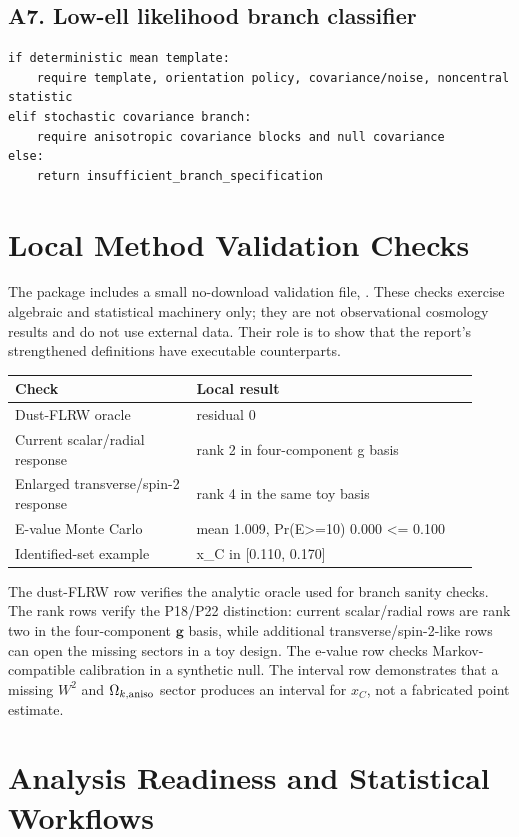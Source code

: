 \documentclass[11pt]{article}
\newcommand{\code}[1]{\texttt{\detokenize{#1}}}
\newcommand{\Wsq}{W^2}
\newcommand{\Omk}{\Omega_{k,{\rm aniso}}}
\begin{document}
\subsection*{A7. Low-ell likelihood branch classifier}
\begin{verbatim}
if deterministic mean template:
    require template, orientation policy, covariance/noise, noncentral statistic
elif stochastic covariance branch:
    require anisotropic covariance blocks and null covariance
else:
    return insufficient_branch_specification
\end{verbatim}

\section{Local Method Validation Checks}
The package includes a small no-download validation file, \code{method_validation_summary.json}.  These checks exercise algebraic and statistical machinery only; they are not observational cosmology results and do not use external data.  Their role is to show that the report's strengthened definitions have executable counterparts.

{\footnotesize
\begin{longtable}{>{\raggedright\arraybackslash}p{0.36\linewidth} >{\raggedright\arraybackslash}p{0.56\linewidth}}
\toprule
Check & Local result\\
\midrule
Dust-FLRW oracle & residual 0\\
Current scalar/radial response & rank 2 in four-component g basis\\
Enlarged transverse/spin-2 response & rank 4 in the same toy basis\\
E-value Monte Carlo & mean 1.009, Pr(E>=10) 0.000 <= 0.100\\
Identified-set example & x\_C in [0.110, 0.170]\\
\bottomrule
\end{longtable}
}

The dust-FLRW row verifies the analytic oracle used for branch sanity checks.  The rank rows verify the P18/P22 distinction: current scalar/radial rows are rank two in the four-component \(\bm g\) basis, while additional transverse/spin-2-like rows can open the missing sectors in a toy design.  The e-value row checks Markov-compatible calibration in a synthetic null.  The interval row demonstrates that a missing \(\Wsq\) and \(\Omk\) sector produces an interval for \(x_C\), not a fabricated point estimate.

\section{Analysis Readiness and Statistical Workflows}
\end{document}
